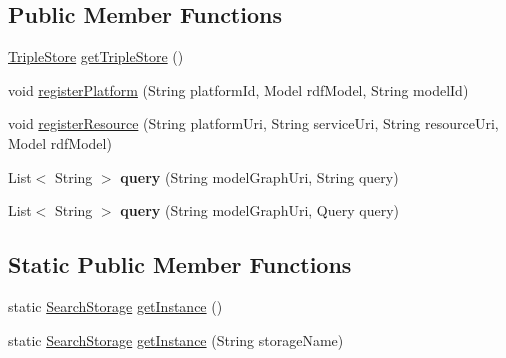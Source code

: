 \subsection*{Public Member Functions}
\begin{DoxyCompactItemize}
\item 
\hyperlink{classeu_1_1h2020_1_1symbiote_1_1ontology_1_1model_1_1TripleStore}{Triple\+Store} \hyperlink{classeu_1_1h2020_1_1symbiote_1_1search_1_1SearchStorage_a94653338069782785b686128ea52c5c2}{get\+Triple\+Store} ()
\item 
void \hyperlink{classeu_1_1h2020_1_1symbiote_1_1search_1_1SearchStorage_a82e5bf8079db6b8ddc014e3d2cb41354}{register\+Platform} (String platform\+Id, Model rdf\+Model, String model\+Id)
\item 
void \hyperlink{classeu_1_1h2020_1_1symbiote_1_1search_1_1SearchStorage_a0b81f975b711ea0616bcfad65b9c5fdf}{register\+Resource} (String platform\+Uri, String service\+Uri, String resource\+Uri, Model rdf\+Model)
\item 
List$<$ String $>$ {\bfseries query} (String model\+Graph\+Uri, String query)\hypertarget{classeu_1_1h2020_1_1symbiote_1_1search_1_1SearchStorage_a603b3351f858aa41a36b53ee73e4eedf}{}\label{classeu_1_1h2020_1_1symbiote_1_1search_1_1SearchStorage_a603b3351f858aa41a36b53ee73e4eedf}

\item 
List$<$ String $>$ {\bfseries query} (String model\+Graph\+Uri, Query query)\hypertarget{classeu_1_1h2020_1_1symbiote_1_1search_1_1SearchStorage_a4b4426aa63015e883766359c94d64bf0}{}\label{classeu_1_1h2020_1_1symbiote_1_1search_1_1SearchStorage_a4b4426aa63015e883766359c94d64bf0}

\end{DoxyCompactItemize}
\subsection*{Static Public Member Functions}
\begin{DoxyCompactItemize}
\item 
static \hyperlink{classeu_1_1h2020_1_1symbiote_1_1search_1_1SearchStorage}{Search\+Storage} \hyperlink{classeu_1_1h2020_1_1symbiote_1_1search_1_1SearchStorage_a49404088c4dcdf94e5f0d6a85b856a5c}{get\+Instance} ()
\item 
static \hyperlink{classeu_1_1h2020_1_1symbiote_1_1search_1_1SearchStorage}{Search\+Storage} \hyperlink{classeu_1_1h2020_1_1symbiote_1_1search_1_1SearchStorage_ad8a5239e7c9df6c07b7b3bf7697f50e1}{get\+Instance} (String storage\+Name)
\end{DoxyCompactItemize}
